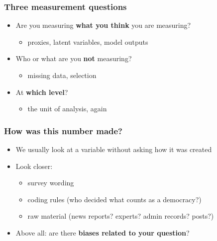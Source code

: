 \begin{frame}
\frametitle{Three measurement questions}
\centering

\vspace{10pt}
\begin{itemize}
  \item[1.] Are you measuring \textbf{what you think} you are measuring?
  \begin{itemize}
    \item proxies, latent variables, model outputs
  \end{itemize}
  \vspace{8pt}
  \item[2.] Who or what are you \textbf{not} measuring?
  \begin{itemize}
    \item missing data, selection
  \end{itemize}
  \vspace{8pt}
  \item[3.] At \textbf{which level}?
  \begin{itemize}
    \item the unit of analysis, again
  \end{itemize}
\end{itemize}

\end{frame}

\begin{frame}
\frametitle{How was this number made?}
\centering

\begin{itemize}
  \item We usually look at a variable without asking how it was created
  \vspace{8pt}
  \item<2-> Look closer:
  \begin{itemize}
    \item<2-> survey wording
    \item<2-> coding rules (who decided what counts as a democracy?)
    \item<2-> raw material (news reports? experts? admin records? posts?)
  \end{itemize}
  \vspace{8pt}
  \item<3-> Above all: are there \textbf{biases related to your question}?
\end{itemize}

\end{frame}

